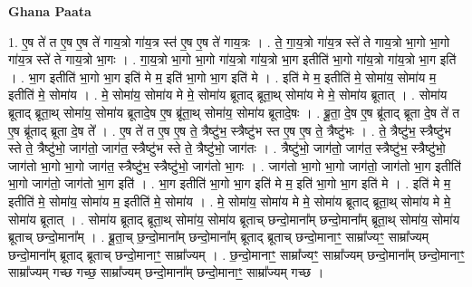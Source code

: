 \documentclass[17pt]{extarticle}
\begin{document}
\textbf{Ghana Paata } \newline

1. ए॒ष ते॑ त ए॒ष ए॒ष ते॑ गाय॒त्रो गा॑य॒त्र स्त॑ ए॒ष ए॒ष ते॑ गाय॒त्रः । . ते॒ गा॒य॒त्रो गा॑य॒त्र स्ते॑ ते गाय॒त्रो भा॒गो भा॒गो गा॑य॒त्र स्ते॑ ते गाय॒त्रो भा॒गः । . गा॒य॒त्रो भा॒गो भा॒गो गा॑य॒त्रो गा॑य॒त्रो भा॒ग इतीति॑ भा॒गो गा॑य॒त्रो गा॑य॒त्रो भा॒ग इति॑ । . भा॒ग इतीति॑ भा॒गो भा॒ग इति॑ मे म॒ इति॑ भा॒गो भा॒ग इति॑ मे । . इति॑ मे म॒ इतीति॑ मे॒ सोमा॑य॒ सोमा॑य म॒ इतीति॑ मे॒ सोमा॑य । . मे॒ सोमा॑य॒ सोमा॑य मे मे॒ सोमा॑य ब्रूताद् ब्रूता॒थ् सोमा॑य मे मे॒ सोमा॑य ब्रूतात् । . सोमा॑य ब्रूताद् ब्रूता॒थ् सोमा॑य॒ सोमा॑य ब्रूतादे॒ष ए॒ष ब्रू॑ता॒थ् सोमा॑य॒ सोमा॑य ब्रूतादे॒षः । . ब्रू॒ता॒ दे॒ष ए॒ष ब्रू॑ताद् ब्रूता दे॒ष ते॑ त ए॒ष ब्रू॑ताद् ब्रूता दे॒ष ते᳚ । . ए॒ष ते॑ त ए॒ष ए॒ष ते॒ त्रैष्टु॑भ॒ स्त्रैष्टु॑भ स्त ए॒ष ए॒ष ते॒ त्रैष्टु॑भः । . ते॒ त्रैष्टु॑भ॒ स्त्रैष्टु॑भ स्ते ते॒ त्रैष्टु॑भो॒ जाग॑तो॒ जाग॑त॒ स्त्रैष्टु॑भ स्ते ते॒ त्रैष्टु॑भो॒ जाग॑तः । . त्रैष्टु॑भो॒ जाग॑तो॒ जाग॑त॒ स्त्रैष्टु॑भ॒ स्त्रैष्टु॑भो॒ जाग॑तो भा॒गो भा॒गो जाग॑त॒ स्त्रैष्टु॑भ॒ स्त्रैष्टु॑भो॒ जाग॑तो भा॒गः । . जाग॑तो भा॒गो भा॒गो जाग॑तो॒ जाग॑तो भा॒ग इतीति॑ भा॒गो जाग॑तो॒ जाग॑तो भा॒ग इति॑ । . भा॒ग इतीति॑ भा॒गो भा॒ग इति॑ मे म॒ इति॑ भा॒गो भा॒ग इति॑ मे । . इति॑ मे म॒ इतीति॑ मे॒ सोमा॑य॒ सोमा॑य म॒ इतीति॑ मे॒ सोमा॑य । . मे॒ सोमा॑य॒ सोमा॑य मे मे॒ सोमा॑य ब्रूताद् ब्रूता॒थ् सोमा॑य मे मे॒ सोमा॑य ब्रूतात् । . सोमा॑य ब्रूताद् ब्रूता॒थ् सोमा॑य॒ सोमा॑य ब्रूताच् छन्दो॒माना᳚म् छन्दो॒माना᳚म् ब्रूता॒थ् सोमा॑य॒ सोमा॑य ब्रूताच् छन्दो॒माना᳚म् । . ब्रू॒ता॒च् छ॒न्दो॒माना᳚म् छन्दो॒माना᳚म् ब्रूताद् ब्रूताच् छन्दो॒मानाꣳ॒॒ साम्रा᳚ज्यꣳ॒॒ साम्रा᳚ज्यम् छन्दो॒माना᳚म् ब्रूताद् ब्रूताच् छन्दो॒मानाꣳ॒॒ साम्रा᳚ज्यम् । . छ॒न्दो॒मानाꣳ॒॒ साम्रा᳚ज्यꣳ॒॒ साम्रा᳚ज्यम् छन्दो॒माना᳚म् छन्दो॒मानाꣳ॒॒ साम्रा᳚ज्यम् गच्छ गच्छ॒ साम्रा᳚ज्यम् छन्दो॒माना᳚म् छन्दो॒मानाꣳ॒॒ साम्रा᳚ज्यम् गच्छ । \newline
\end{document}
